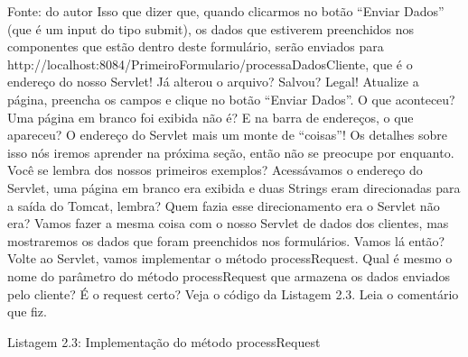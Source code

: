 Fonte: do autor
Isso que dizer que, quando clicarmos no botão “Enviar Dados” (que é um input do tipo submit), os dados que estiverem preenchidos nos componentes que estão dentro deste formulário, serão enviados para http://localhost:8084/PrimeiroFormulario/processaDadosCliente, que é o endereço do nosso Servlet! Já alterou o arquivo? Salvou? Legal! Atualize a página, preencha os campos e clique no botão “Enviar Dados”. O que aconteceu? Uma página em branco foi exibida não é? E na barra de endereços, o que apareceu? O endereço do Servlet mais um monte de “coisas”! Os detalhes sobre isso nós iremos aprender na próxima seção, então não se preocupe por enquanto.
Você se lembra dos nossos primeiros exemplos? Acessávamos o endereço do Servlet, uma página em branco era exibida e duas Strings eram direcionadas para a saída do Tomcat, lembra? Quem fazia esse direcionamento era o Servlet não era? Vamos fazer a mesma coisa com o nosso Servlet de dados dos clientes, mas mostraremos os dados que foram preenchidos nos formulários. Vamos lá então?
Volte ao Servlet, vamos implementar o método processRequest. Qual é mesmo o nome do parâmetro do método processRequest que armazena os dados enviados pelo cliente? É o request certo? Veja o código da Listagem 2.3. Leia o comentário que fiz.













Listagem 2.3: Implementação do método processRequest
 

